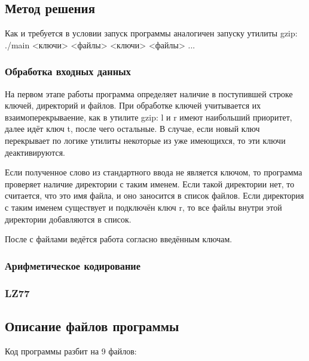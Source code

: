 \documentclass[12pt]{article}
\begin{document}
\subsection*{Метод решения}

Как и требуется в условии запуск программы аналогичен запуску утилиты gzip: ./main <ключи> <файлы> <ключи> <файлы> ...

\subsubsection*{Обработка входных данных}

На первом этапе работы программа определяет наличие в поступившей строке ключей, директорий и файлов.
При обработке ключей учитывается их взаимоперекрываение, как в утилите gzip: l и r имеют наибольший приоритет, далее идёт ключ t, после чего остальные. В случае, если новый ключ перекрывает по логике утилиты некоторые из уже имеющихся, то эти ключи деактивируются.

Если полученное слово из стандартного ввода не является ключом, то программа проверяет наличие директории с таким именем. Если такой директории нет, то считается, что это имя файла, и оно заносится в список файлов. Если директория с таким именем существует и подключён ключ r, то все файлы внутри этой директории добавляются в список.

После с файлами ведётся работа согласно введённым ключам.

\subsubsection*{Арифметическое кодирование}%


\subsubsection*{LZ77}%



\subsection*{Описание файлов программы}

Код программы разбит на 9 файлов:%
\end{document}
